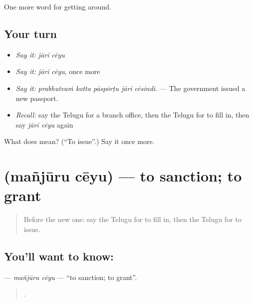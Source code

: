 \begin{grammarlens}[title={What you've built}]
One more word for getting around.
\end{grammarlens}

\subsection*{Your turn}
\begin{itemize}
\raggedright
  \item \emph{Say it:} \emph{jārī cēyu}
  \item \emph{Say it:} \emph{jārī cēyu}, once more
  \item \emph{Say it:} \emph{prabhutvaṁ kotta pāspōrṭu jārī cēsindi.} — The government issued a new passport.
  \item \emph{Recall:} say the Telugu for a branch office, then the Telugu for to fill in, then say \emph{jārī cēyu} again
\end{itemize}

\begin{tcolorbox}[breakable,colback=teal!4,colframe=teal!35!black,title={Before you move on}]
What does   mean? (\textquotedblleft{}To issue\textquotedblright{}.) Say it once more.
\end{tcolorbox}
\section[\texorpdfstring{\te{మంజూరు} \te{చేయు} (mañjūru cēyu)}{మంజూరు చేయు (mañjūru cēyu)}]{  (mañjūru cēyu) — to sanction; to grant}

\label{lesson:TE-C462-manjuru-ceyu}



\begin{quote}
Before the new one: say the Telugu for to fill in, then the Telugu for to issue.
\end{quote}

\subsection*{You'll want to know:  }
\textbf{ } — \emph{mañjūru cēyu} — \textquotedblleft{}to sanction; to grant\textquotedblright{}.

\begin{quote}
    .
\end{quote}

